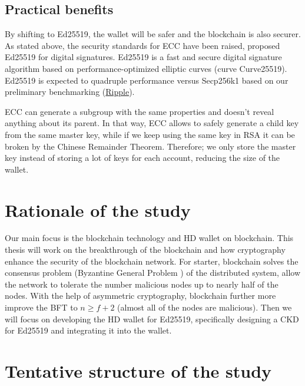 \subsection{Practical benefits}

By shifting to Ed25519, the wallet will be safer and the blockchain is also securer. As stated above, the security standards for ECC have been raised, proposed Ed25519 for digital signatures. Ed25519 is a fast and secure digital signature algorithm based on performance-optimized elliptic curves (curve Curve25519). Ed25519 is expected to quadruple performance versus Secp256k1 based on our preliminary benchmarking (\href{https://ripple.com/insights/curves-with-a-twist/}{Ripple}).

ECC can generate a subgroup with the same properties and doesn't reveal anything about its parent. In that way, ECC allows to safely generate a child key from the same master key, while if we keep using the same key in RSA it can be broken by the Chinese Remainder Theorem. Therefore; we only store the master key instead of storing a lot of keys for each account, reducing the size of the wallet.


\section{Rationale of the study}

Our main focus is the blockchain technology and HD wallet on blockchain. This thesis will work on the breakthrough of the blockchain and how cryptography enhance the security of the blockchain network. For starter, blockchain solves the consensus problem (Byzantine General Problem \cite{DBLP:journals/toplas/LamportSP82}) of the distributed system, allow the network to tolerate the number malicious nodes up to nearly half of the nodes. With the help of asymmetric cryptography, blockchain further more improve the BFT to $n \geq f + 2$ (almost all of the nodes are malicious). Then we will focus on developing the HD wallet for Ed25519, specifically designing a CKD for Ed25519 and integrating it into the wallet.

\section{Tentative structure of the study}

